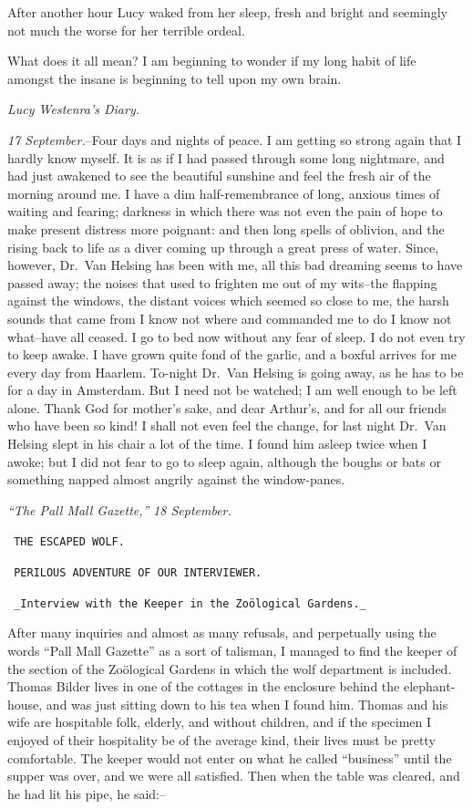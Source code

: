 \documentclass[12pt,openright]{book}
\begin{document}
After another hour Lucy waked from her sleep, fresh and bright and seemingly not much the worse for her terrible ordeal.

What does it all mean? I am beginning to wonder if my long habit of life amongst the insane is beginning to tell upon my own brain.

\textit{Lucy Westenra’s Diary.}

\textit{17 September.}–Four days and nights of peace. I am getting so strong again that I hardly know myself. It is as if I had passed through some long nightmare, and had just awakened to see the beautiful sunshine and feel the fresh air of the morning around me. I have a dim half-remembrance of long, anxious times of waiting and fearing; darkness in which there was not even the pain of hope to make present distress more poignant: and then long spells of oblivion, and the rising back to life as a diver coming up through a great press of water. Since, however, Dr. Van Helsing has been with me, all this bad dreaming seems to have passed away; the noises that used to frighten me out of my wits–the flapping against the windows, the distant voices which seemed so close to me, the harsh sounds that came from I know not where and commanded me to do I know not what–have all ceased. I go to bed now without any fear of sleep. I do not even try to keep awake. I have grown quite fond of the garlic, and a boxful arrives for me every day from Haarlem. To-night Dr. Van Helsing is going away, as he has to be for a day in Amsterdam. But I need not be watched; I am well enough to be left alone. Thank God for mother’s sake, and dear Arthur’s, and for all our friends who have been so kind! I shall not even feel the change, for last night Dr. Van Helsing slept in his chair a lot of the time. I found him asleep twice when I awoke; but I did not fear to go to sleep again, although the boughs or bats or something napped almost angrily against the window-panes.

\textit{“}\textit{The Pall Mall Gazette,}\textit{”}\textit{ }\textit{18 September.}

\texttt{                       THE ESCAPED WOLF.}

\texttt{     PERILOUS ADVENTURE OF OUR INTERVIEWER.}

\texttt{     \_Interview with the Keeper in the Zoölogical Gardens.\_}

After many inquiries and almost as many refusals, and perpetually using the words “Pall Mall Gazette” as a sort of talisman, I managed to find the keeper of the section of the Zoölogical Gardens in which the wolf department is included. Thomas Bilder lives in one of the cottages in the enclosure behind the elephant-house, and was just sitting down to his tea when I found him. Thomas and his wife are hospitable folk, elderly, and without children, and if the specimen I enjoyed of their hospitality be of the average kind, their lives must be pretty comfortable. The keeper would not enter on what he called “business” until the supper was over, and we were all satisfied. Then when the table was cleared, and he had lit his pipe, he said:–
\end{document}
